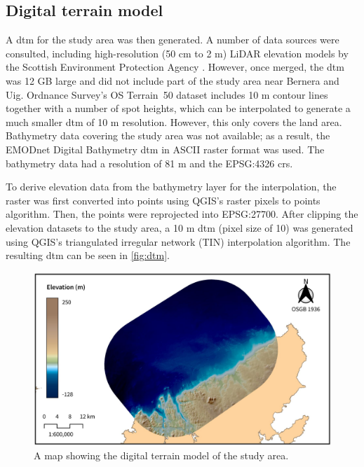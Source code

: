 \newpage
\subsection{Digital terrain model}

A \gls{dtm} for the study area was then generated. A number of data sources were consulted, including high-resolution (50 cm to 2 m) LiDAR elevation models by the Scottish Environment Protection Agency \autocite{sepa-lidar}. However, once merged, the \gls{dtm} was 12 GB large and did not include part of the study area near Bernera and Uig. Ordnance Survey's OS Terrain\textregistered\ 50 dataset includes 10 m contour lines together with a number of spot heights, which can be interpolated to generate a much smaller \gls{dtm} of 10 m resolution. However, this only covers the land area. Bathymetry data covering the study area was not available; as a result, the EMODnet Digital Bathymetry \gls{dtm} in ASCII raster format was used. The bathymetry data had a resolution of 81 m and the EPSG:4326 \gls{crs}.

To derive elevation data from the bathymetry layer for the interpolation, the raster was first converted into points using QGIS's raster pixels to points algorithm. Then, the points were reprojected into EPSG:27700. After clipping the elevation datasets to the study area, a 10 m \gls{dtm} (pixel size of 10) was generated using QGIS's triangulated irregular network (TIN) interpolation algorithm. The resulting \gls{dtm} can be seen in \autoref{fig:dtm}.

\begin{figure}
  \centering
  \includegraphics{images/maps/hillshade_dtm}
  \caption{A map showing the digital terrain model of the study area. \label{fig:dtm}}
\end{figure}

